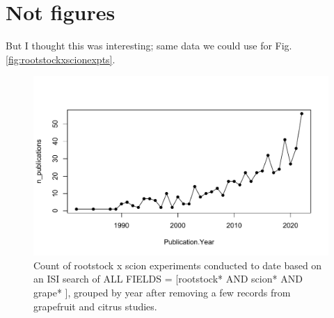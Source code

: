 \documentclass[11pt]{article}
\begin{document}
\newpage
\section{Not figures}
But I thought this was interesting; same data we could use for Fig. \ref{fig:rootstockxscionexpts}.
\begin{figure}[h!]
\centering
\noindent \includegraphics[width=1\textwidth]{figures/rootstockpubyears.pdf}
\caption{Count of rootstock x scion experiments conducted to date based on an ISI search of ALL FIELDS = [rootstock* AND scion* AND grape* ], grouped by year after removing a few records from grapefruit and citrus studies. }
\label{fig:rootstockxscionexptsyears}
\end{figure}
\end{document}

